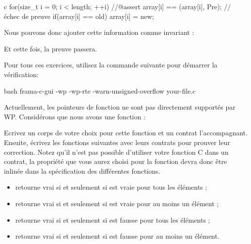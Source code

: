 \begin{CodeBlock}{c}
for(size_t i = 0; i < length; ++i){
    //@assert array[i] == \at(array[i], Pre); // échec de preuve
    if(array[i] == old) array[i] = new;
}
\end{CodeBlock}



Nous pouvons donc ajouter cette information comme invariant :






Et cette fois, la preuve passera. 





Pour tous ces exercices, utilisez la commande suivante pour démarrer la vérification:

\begin{CodeBlock}{bash}
frama-c-gui -wp -wp-rte -warn-unsigned-overflow your-file.c
\end{CodeBlock}  




Actuellement, les pointeurs de fonction ne sont pas directement supportés par WP.
Considérons que nous avons une fonction :





Ecrivez un corps de votre choix pour cette fonction et un contrat l'accompagnant.
Ensuite, écrivez les fonctions suivantes avec leurs contrats pour prouver leur
correction. Notez qu'il n'est pas possible d'utiliser votre fonction C dans un
contrat, la propriété que vous aurez choisi pour la fonction 
devra donc être inlinée dans la spécification des différentes fonctions.

\begin{itemize}
\item {} retourne vrai si et seulement si 
  est vraie pour tous les éléments ;
\item {} retourne vrai si et seulement si 
  est vraie pour au moins un élément ;
\item {} retourne vrai si et seulement si 
  est fausse pour tous les éléments ;
\item {} retourne vrai si et seulement si 
  est fausse pour au moins un élément.
\end{itemize}

